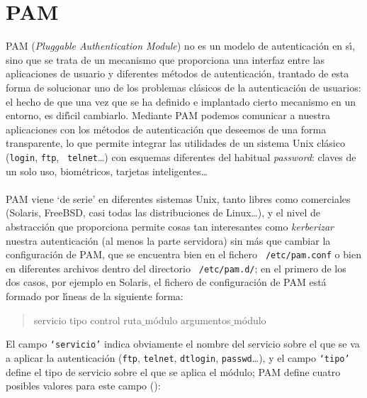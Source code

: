 \section{PAM}
PAM ({\it Pluggable Authentication Module}) no es un modelo de autenticaci\'on 
en s\'{\i}, sino que se trata de un mecanismo que proporciona una interfaz
entre las aplicaciones de usuario y diferentes m\'etodos de autenticaci\'on, 
trantado de esta forma de solucionar uno de los problemas cl\'asicos de la 
autenticaci\'on de usuarios: el hecho de que una vez que se ha definido e 
implantado cierto mecanismo en un entorno, es dif\'{\i}cil cambiarlo. Mediante
PAM podemos comunicar a nuestra aplicaciones con los m\'etodos de 
autenticaci\'on que deseemos de una forma transparente, lo que permite integrar 
las utilidades de un sistema Unix cl\'asico ({\tt login}, {\tt ftp}, {\tt 
telnet}\ldots) con esquemas diferentes del habitual {\it password}: claves de 
un solo uso, biom\'etricos, tarjetas inteligentes\ldots\\
\\PAM viene `de serie' en diferentes sistemas Unix, tanto libres como 
comerciales (Solaris, FreeBSD, casi todas las distribuciones de Linux\ldots), y
el nivel de abstracci\'on que proporciona permite cosas tan interesantes como
{\it kerberizar} nuestra autenticaci\'on (al menos la parte servidora) sin m\'as
que cambiar la configuraci\'on de PAM, que se encuentra bien en el fichero {\tt 
/etc/pam.conf} o bien en diferentes archivos dentro del directorio {\tt 
/etc/pam.d/}; en el primero de los dos casos, por ejemplo en Solaris, el 
fichero de configuraci\'on de PAM est\'a formado por l\'{\i}neas de la 
siguiente forma:
\begin{quote}
servicio    tipo    control    ruta$\_$m\'odulo    argumentos$\_$m\'odulo
\end{quote}
El campo {\tt `servicio'} indica obviamente el nombre del servicio sobre el
que se va a aplicar la autenticaci\'on ({\tt ftp}, {\tt telnet}, {\tt dtlogin},
{\tt passwd}\ldots), y el campo {\tt `tipo'} define el tipo de servicio sobre
el que se aplica el m\'odulo; PAM define cuatro posibles valores para este 
campo (\cite{kn:her00}):
